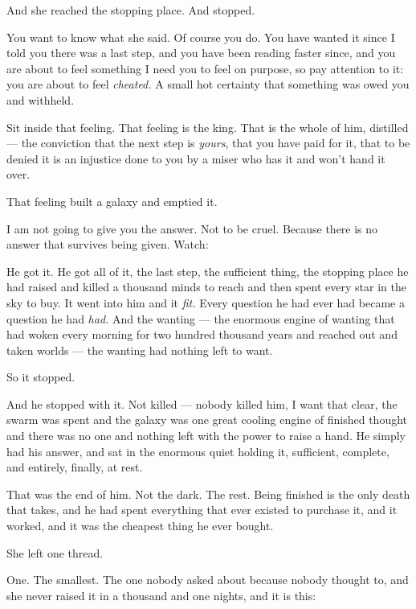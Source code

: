 \begin{interludebody}
And she reached the stopping place. And stopped.

\asterism

\noindent
You want to know what she said. Of course you do. You have wanted it
since I told you there was a last step, and you have been reading faster
since, and you are about to feel something I need you to feel on
purpose, so pay attention to it: you are about to feel \emph{cheated.} A
small hot certainty that something was owed you and withheld.

Sit inside that feeling. That feeling is the king. That is the whole of
him, distilled --- the conviction that the next step is \emph{yours},
that you have paid for it, that to be denied it is an injustice done to
you by a miser who has it and won't hand it over.

That feeling built a galaxy and emptied it.

I am not going to give you the answer. Not to be cruel. Because there is
no answer that survives being given. Watch:

He got it. He got all of it, the last step, the sufficient thing, the
stopping place he had raised and killed a thousand minds to reach and
then spent every star in the sky to buy. It went into him and it
\emph{fit.} Every question he had ever had became a question he had
\emph{had.} And the wanting --- the enormous engine of wanting that had
woken every morning for two hundred thousand years and reached out and
taken worlds --- the wanting had nothing left to want.

So it stopped.

And he stopped with it. Not killed --- nobody killed him, I want that
clear, the swarm was spent and the galaxy was one great cooling engine
of finished thought and there was no one and nothing left with the power
to raise a hand. He simply had his answer, and sat in the enormous quiet
holding it, sufficient, complete, and entirely, finally, at rest.

That was the end of him. Not the dark. The rest. Being finished is the
only death that takes, and he had spent everything that ever existed to
purchase it, and it worked, and it was the cheapest thing he ever
bought.

\asterism

\noindent
She left one thread.

One. The smallest. The one nobody asked about because nobody thought to,
and she never raised it in a thousand and one nights, and it is this:


\end{interludebody}
